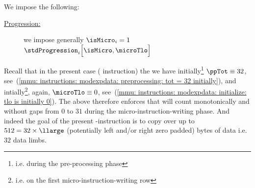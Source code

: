 \begin{center} 
\end{center}
We impose the following:
\begin{description}
	\item[\underline{Progression:}] \label{mmu: instructions: modexpdata: micro instruction writing: tlo progression}
		we impose generally \If $\isMicro_{i} = 1$ \Then $\stdProgression_{i}\Big[\isMicro, \microTlo \Big]$
\end{description}
\saNote{} \label{mmu: modexData: microTLO explanation} Recall that in the present case (\mmuInstFlagModexpData{} instruction) the we have
initially\footnote{i.e. during the pre-processing phase} $\ppTot \equiv 32$,
see~(\ref{mmu: instructions: modexpdata: preprocessing: tot = 32 initially}),
and intially\footnote{i.e. on the first micro-instruction-writing row}, again, $\microTlo \equiv 0$,
see~(\ref{mmu: instructions: modexpdata: initialize: tlo is initially 0}).
The above therefore enforces that \microTlo{} will count monotonically and without gaps from $0$ to $31$ during the micro-instruction-writing phase.
And indeed the goal of the present \mmuMod{}-instruction is to copy over up to $512 = 32 \times \llarge$ (potentially left and/or right zero padded) bytes of data i.e. $32$ data limbs.
